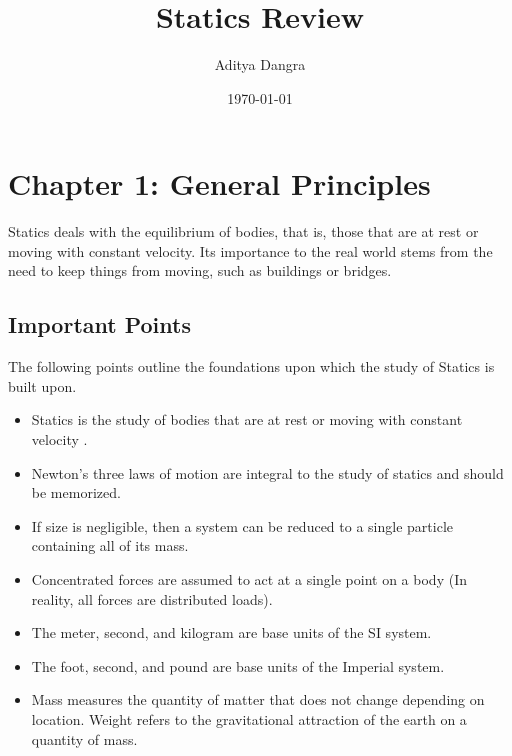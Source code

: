 \documentclass[12pt]{article}
\begin{document}
\title{Statics Review}
\author{Aditya Dangra}
\date{\today}
\maketitle

\tableofcontents
\pagebreak
{}

\section{Chapter 1: General Principles}
Statics deals with the equilibrium of bodies, that is, those that are at rest or moving with constant velocity.
Its importance to the real world stems from the need to keep things from moving, such as buildings or bridges.

\subsection{Important Points}
The following points outline the foundations upon which the study of Statics is built upon.
\begin{itemize}
    \item Statics is the study of bodies that are at rest or moving with constant velocity \cite{hibbeler}.
    \item Newton's three laws of motion are integral to the study of statics and should be memorized.
    \item If size is negligible, then a system can be reduced to a single particle containing all of its mass.
    \item Concentrated forces are assumed to act at a single point on a body (In reality, all forces are distributed loads).
    \item The meter, second, and kilogram are base units of the SI system.
    \item The foot, second, and pound are base units of the Imperial system.
    \item Mass measures the quantity of matter that does not change depending on location. Weight refers to the gravitational attraction of the earth on a quantity of mass.
\end{itemize}
\end{document}
